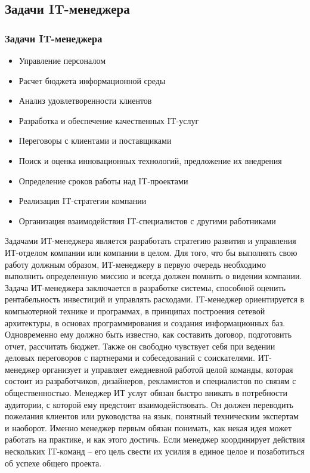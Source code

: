 \documentclass{../industrial-development}
\begin{document}
\subsection{Задачи IT-менеджера}
\begin{frame} \frametitle{Задачи IT-менеджера}
\begin{itemize}	
		\item Управление персоналом
		\item Расчет бюджета информационной среды
	 	\item Анализ удовлетворенности клиентов
	 	\item Разработка и обеспечение качественных IT-услуг
		\item Переговоры с клиентами и поставщиками
	 	\item Поиск и оценка инновационных технологий, предложение их внедрения
	 	\item Определение сроков работы над IT-проектами
	           \item Реализация IT-стратегии компании
		\item Организация взаимодействия IT-специалистов с другими работниками
 \end{itemize}
\end{frame}
\lecturenotes
Задачами ИТ-менеджера является разработать стратегию развития и управления ИТ-отделом компании или компании в целом. Для того, что бы выполнять свою работу должным образом, ИТ-менеджеру в первую очередь необходимо выполнить определенную миссию и всегда должен помнить о видении компании. Задача ИТ-менеджера заключается в разработке системы, способной оценить рентабельность инвестиций и управлять расходами. 
IT-менеджер ориентируется в компьютерной технике и программах, в принципах построения сетевой архитектуры, в основах программирования и создания информационных баз. Одновременно ему должно быть известно, как составить договор, подготовить отчет, рассчитать бюджет. Также он свободно чувствует себя при ведении деловых переговоров с партнерами и собеседований с соискателями. 
ИТ-менеджер организует и управляет ежедневной работой целой команды, которая состоит из разработчиков, дизайнеров, рекламистов и специалистов по связям с общественностью. 
Менеджер ИТ услуг обязан быстро вникать в потребности аудитории, с которой ему предстоит взаимодействовать. Он должен переводить пожелания клиентов или руководства на язык, понятный техническим экспертам и наоборот. Именно менеджер первым обязан понимать, как некая идея может работать на практике, и как этого достичь. Если менеджер координирует действия нескольких IT-команд – его цель свести их усилия в единое целое и позаботиться об успехе общего проекта.
\end{document}
